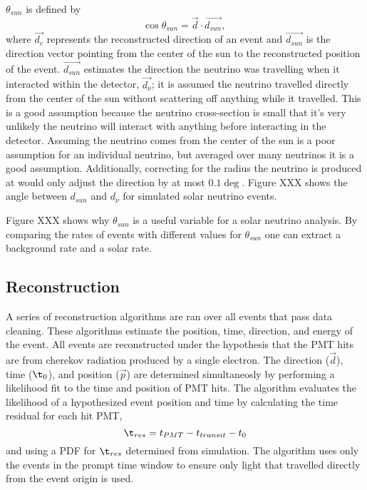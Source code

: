 $\theta_{sun}$ is defined by
\begin{equation}
\cos\theta_{sun} = \vec{d}\cdot\vec{d_{sun}}\text{, }
\end{equation}
where $\vec{d_{e}}$ represents the reconstructed direction of an event and
$\vec{d_{sun}}$ is the direction vector pointing from the center of the sun to
the reconstructed position of the event.
$\vec{d_{sun}}$ estimates the direction the neutrino was travelling when it interacted
within the detector, $\vec{d_{\nu}}$; it is assumed the neutrino travelled directly
from the center of the sun without scattering off anything while it travelled.
This is a good assumption because the neutrino cross-section is small that it's very
unlikely the neutrino will interact with anything before interacting in the detector.
Assuming the neutrino comes from the center of the sun is a poor assumption for an individual
neutrino, but averaged over many neutrinos it is a good assumption.
Additionally, correcting for the radius the neutrino is produced at would only adjust
the direction by at most $0.1\deg$.
Figure XXX shows the angle between $d_{sun}$ and $d_{\nu}$ for simulated solar neutrino
events.

Figure XXX shows why $\theta_{sun}$ is a useful variable for a solar neutrino analysis.
By comparing the rates of events with different values for $\theta_{sun}$ one can
extract a background rate and a solar rate.

\subsection{Reconstruction}
A series of reconstruction algorithms are ran over all events that pass data cleaning.
These algorithms estimate the position, time, direction, and energy of the event.
All events are reconstructed under the hypothesis that the PMT hits are from cherekov radiation
produced by a single electron.
The direction ($\vec{d}$), time ($\t_{0}$), and position ($\vec{p}$) are determined simultaneosly by performing a likelihood
fit to the time and position of PMT hits.
The algorithm evaluates the likelihood of a hypothesized event position and time by
calculating the time residual for each hit PMT,
\begin{equation}
\t_{res} = t_{PMT} - t_{transit} - t_{0}
\end{equation}
and using a PDF for $\t_{res}$ determined from simulation.
The algorithm uses only the events in the prompt time window to ensure only light
that travelled directly from the event origin is used.

